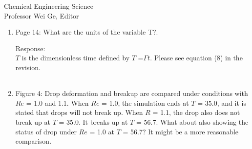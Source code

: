 \documentclass{letter}
\begin{document}
\begin{letter}{
Chemical Engineering Science\\
Professor Wei Ge, Editor\\}
\begin{enumerate}
Response: \\
Table 1 shows the comparison of the deformation parameter $D$ (Li et al., Physics of Fluids, Vol.12, 269–282, 2000) for a drop as a function of 
$Re$ ($Ca$ = 0.3, $\lambda =1$ and $\eta = 1$).
The $D$ computationally obtained by Li et al. (2000) is regarded as a benchmark problem in this field. First, we compared the $D$ by Li et al. (2000) 
with our computational results. Also, In Fig. 2,  we compared the appearance of drop breakup (Renardy and Cristini, 
Physics of Fluids, Vol.13, 2161–2164, 2001) with our computational results.
On the other hand, regarding quantitative physical quantities on bubble deformation and breakup, only experimental results for $D$ exist under 
the condition of $Re \simeq 0$.
Thus, As shown in Table 2, we performed the comparison of the deformation parameter $D$ for a bubble as a function of  $Ca$ 
($Re \simeq 0$, $\lambda  \simeq 0$ and $\eta  \simeq 0$). In the experiments, obtaining precise experimental data will be difficult because 
the dynamic motion of a bubble in a highly viscous liquid in an experimental device needs to be accurately set.
We don't know the cause of the difference between both experimental results, but our numerical results were close to those of Rust and 
Manga (Journal of Colloid and 
Interface Science, Vol. 249, 476– 480 2002). For your reference, computations for bubble deformation with the condition of $Re \simeq 0$ 
were hard tasks and a very long computational time (one year) was needed. \\ \\

\par\noindent
\item
\textsf
{Page 14: What are the units of the variable T?.}
\vspace{3 mm}

Response: \\
$T$ is the dimensionless time defined by $T$ =$\mathit{\Gamma} t$.  Please see
equation (8) in the revision. \\
\\

\par\noindent
\item
\textsf
{Figure 4: Drop deformation and breakup are compared under conditions with $Re$ = 1.0 and 1.1. When $Re$ = 1.0, the simulation ends at $T$ = 35.0, and it is stated that drops will not break up. When $R$ = 1.1, the drop also does not break up at $T$ = 35.0. It breaks up at $T$ = 56.7. What about also showing the status of drop under $Re$ = 1.0 at $T$ = 56.7? It might be a more reasonable comparison.}
\vspace{3 mm}


\end{enumerate}
\end{letter}
\end{document}
